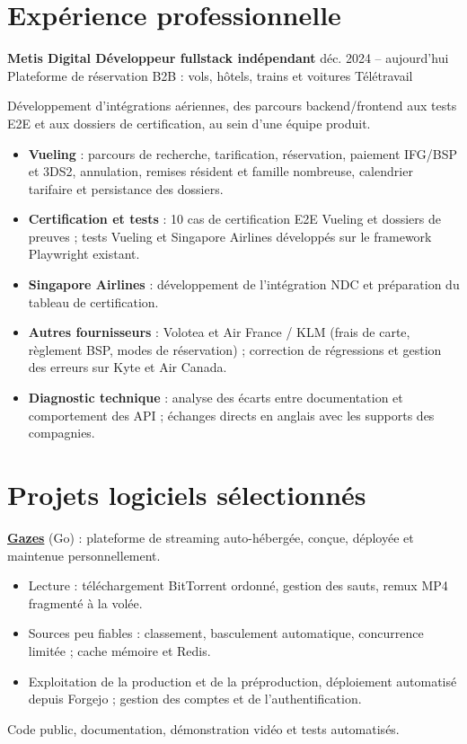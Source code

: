 \documentclass[10pt,a4paper]{article}
\newcommand{\role}[3]{\textbf{#1} \hfill {\color{muted}\small #3}\\[-1pt]{\color{muted}#2}\par\vspace{3pt}}
\newcommand{\project}[3]{\textbf{#1} {\color{muted}(#2)} : #3\par\vspace{1pt}}
\newcommand{\proof}[1]{{\small\color{muted}#1}\par}
\newcommand{\projectgap}{\vspace{7pt}}
\begin{document}
\section{Expérience professionnelle}
\role{Metis Digital \textperiodcentered{} Développeur fullstack indépendant}{Plateforme de réservation B2B : vols, hôtels, trains et voitures \textperiodcentered{} Télétravail}{déc. 2024 -- aujourd'hui}
Développement d'intégrations aériennes, des parcours backend/frontend aux tests E2E et aux dossiers de certification, au sein d'une équipe produit.
\begin{itemize}
  \item \textbf{Vueling} : parcours de recherche, tarification, réservation, paiement IFG/BSP et 3DS2, annulation, remises résident et famille nombreuse, calendrier tarifaire et persistance des dossiers.
  \item \textbf{Certification et tests} : 10 cas de certification E2E Vueling et dossiers de preuves ; tests Vueling et Singapore Airlines développés sur le framework Playwright existant.
  \item \textbf{Singapore Airlines} : développement de l'intégration NDC et préparation du tableau de certification.
  \item \textbf{Autres fournisseurs} : Volotea et Air France / KLM (frais de carte, règlement BSP, modes de réservation) ; correction de régressions et gestion des erreurs sur Kyte et Air Canada.
  \item \textbf{Diagnostic technique} : analyse des écarts entre documentation et comportement des API ; échanges directs en anglais avec les supports des compagnies.
\end{itemize}

\section{Projets logiciels sélectionnés}
\project{\href{https://github.com/delikesance/gazes}{Gazes}}{Go}{plateforme de streaming auto-hébergée, conçue, déployée et maintenue personnellement.}
\begin{itemize}
  \item Lecture : téléchargement BitTorrent ordonné, gestion des sauts, remux MP4 fragmenté à la volée.
  \item Sources peu fiables : classement, basculement automatique, concurrence limitée ; cache mémoire et Redis.
  \item Exploitation de la production et de la préproduction, déploiement automatisé depuis Forgejo ; gestion des comptes et de l'authentification.
\end{itemize}
\proof{Code public, documentation, démonstration vidéo et tests automatisés.}
\projectgap
\end{document}
